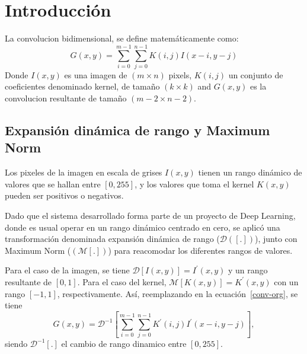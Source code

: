\chapter{Introducción}\label{intro_secc}

La convolucion bidimensional, se define matemáticamente como:
\begin{equation}\label{conv-org}
  G(x,y) = \sum_{i=0}^{m-1} \sum_{j=0}^{n-1}K(i,j)I(x-i,y-j)
\end{equation}
Donde $I(x,y)$ es una imagen de $(m \times n)$ pixels, $K(i,j)$ un conjunto de
coeficientes denominado kernel, de tamaño $(k \times k)$ and $G(x,y)$ es la
convolucion resultante de tamaño  $(m-2 \times n-2)$.

\section{Expansión dinámica de rango y Maximum Norm}\label{dynamicrange}

Los pixeles de la imagen en escala de grises $I(x,y)$ tienen un rango dinámico de valores que se hallan entre $[0,255]$,
y los valores que toma el kernel $K(x,y)$ pueden ser positivos o negativos.

Dado que el sistema desarrollado forma parte de un proyecto de Deep Learning,
donde es usual operar en un rango dinámico centrado en cero, se aplicó una
transformación denominada  expansión dinámica de rango ($\mathcal{D}([.])$),
junto con Maximum Norm ($(\mathcal{M}[.])$) para reacomodar los diferentes 
rangos de valores. 

Para el caso de la imagen, se tiene $\mathcal{D}[I(x,y)]=I^\prime(x,y)$ y un rango resultante de $[0,1]$.
Para el caso del kernel, $\mathcal{M}[K(x,y)]=K^\prime(x,y)$ con un rango $[-1,1]$, respectivamente.
Así, reemplazando en la ecuación~\ref{conv-org}, se tiene 
\begin{equation}\label{conv-org1}
  G(x,y) = \mathcal{D}^{-1}\left[\sum_{i=0}^{m-1} \sum_{j=0}^{n-1}K^\prime(i,j)I^\prime(x-i,y-j)\right],
\end{equation}
siendo $\mathcal{D}^{-1}[.]$ el cambio de rango dinamico entre $[0,255]$.


